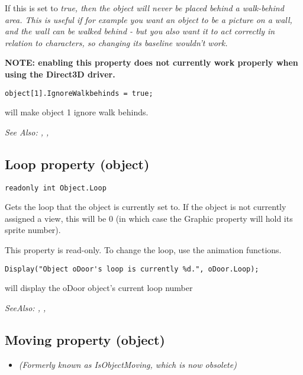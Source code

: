 If this is set to \it{true}, then the object will never be placed behind a walk-behind
area. This is useful if for example you want an object to be a picture on
a wall, and the wall can be walked behind - but you also want it to act
correctly in relation to characters, so changing its baseline wouldn't work.

\bf{NOTE:} enabling this property does not currently work properly when using
the Direct3D driver.

\begin{verbatim}
object[1].IgnoreWalkbehinds = true;
\end{verbatim}
will make object 1 ignore walk behinds.


\it{See Also:} ,
, 


\subsection{Loop property (object)}\label{Object.Loop}%

\begin{verbatim}
readonly int Object.Loop
\end{verbatim}
Gets the loop that the object is currently set to. If the object is not currently
assigned a view, this will be 0 (in which case the Graphic property will
hold its sprite number).

This property is read-only. To change the loop, use the animation functions.

\begin{verbatim}
Display("Object oDoor's loop is currently %d.", oDoor.Loop);
\end{verbatim}
will display the oDoor object's current loop number

\it{SeeAlso:} ,
,


\subsection{Moving property (object)}\label{Object.Moving}%

\begin{itemize}
\item \it{(Formerly known as IsObjectMoving, which is now obsolete)}
\end{itemize}

